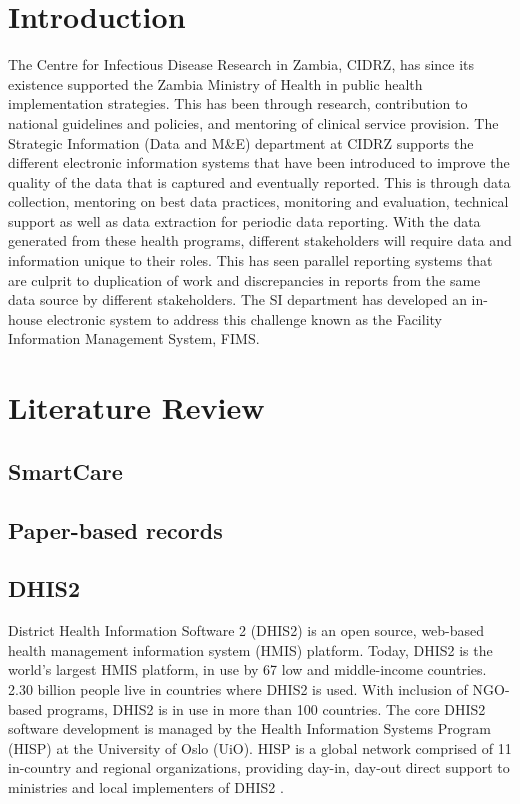 \documentclass[conference]{IEEEtran}
\begin{document}
\section{Introduction}
The Centre for Infectious Disease Research in Zambia, CIDRZ, has since its existence supported the Zambia Ministry of Health in public health implementation strategies.
This has been through research, contribution to national guidelines and policies, and mentoring of clinical service provision.
The Strategic Information (Data and M\&E) department at CIDRZ supports the different electronic information systems that have been introduced to improve the quality of the data that is captured and eventually reported.
This is through data collection, mentoring on best data practices, monitoring and evaluation, technical support as well as data extraction for periodic data reporting.
With the data generated from these health programs, different stakeholders will require data and information unique to their roles.
This has seen parallel reporting systems that are culprit to duplication of work and discrepancies in reports from the same data source by different stakeholders.
The SI department has developed an in-house electronic system to address this challenge known as the Facility Information Management System, FIMS.

\section{Literature Review}
\subsection{SmartCare}

\subsection{Paper-based records}

\subsection{DHIS2}
District Health Information Software 2 (DHIS2) is an open source, web-based health management information system (HMIS) platform. Today, DHIS2 is the world's largest HMIS platform, in use by 67 low and middle-income countries.
2.30 billion people live in countries where DHIS2 is used. With inclusion of NGO-based programs, DHIS2 is in use in more than 100 countries. The core DHIS2 software development is managed by the Health Information Systems Program (HISP) at the University of Oslo (UiO).
HISP is a global network comprised of 11 in-country and regional organizations, providing day-in, day-out direct support to ministries and local implementers of DHIS2 \cite{b1}.
\end{document}
